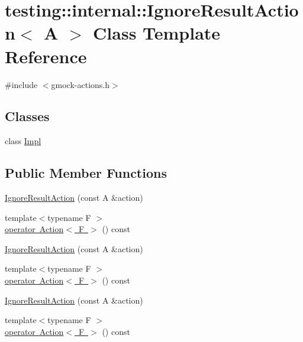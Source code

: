 \hypertarget{classtesting_1_1internal_1_1_ignore_result_action}{}\section{testing\+::internal\+::Ignore\+Result\+Action$<$ A $>$ Class Template Reference}
\label{classtesting_1_1internal_1_1_ignore_result_action}


{\ttfamily \#include $<$gmock-\/actions.\+h$>$}

\subsection*{Classes}
\begin{DoxyCompactItemize}
\item 
class \mbox{\hyperlink{classtesting_1_1internal_1_1_ignore_result_action_1_1_impl}{Impl}}
\end{DoxyCompactItemize}
\subsection*{Public Member Functions}
\begin{DoxyCompactItemize}
\item 
\mbox{\hyperlink{classtesting_1_1internal_1_1_ignore_result_action_a9199f7b1b7771b2e2a5fd28caf624623}{Ignore\+Result\+Action}} (const A \&action)
\item 
{\footnotesize template$<$typename F $>$ }\\\mbox{\hyperlink{classtesting_1_1internal_1_1_ignore_result_action_affb8b7439604c860e1416f45339c6e37}{operator Action$<$ F $>$}} () const
\item 
\mbox{\hyperlink{classtesting_1_1internal_1_1_ignore_result_action_a9199f7b1b7771b2e2a5fd28caf624623}{Ignore\+Result\+Action}} (const A \&action)
\item 
{\footnotesize template$<$typename F $>$ }\\\mbox{\hyperlink{classtesting_1_1internal_1_1_ignore_result_action_affb8b7439604c860e1416f45339c6e37}{operator Action$<$ F $>$}} () const
\item 
\mbox{\hyperlink{classtesting_1_1internal_1_1_ignore_result_action_a9199f7b1b7771b2e2a5fd28caf624623}{Ignore\+Result\+Action}} (const A \&action)
\item 
{\footnotesize template$<$typename F $>$ }\\\mbox{\hyperlink{classtesting_1_1internal_1_1_ignore_result_action_affb8b7439604c860e1416f45339c6e37}{operator Action$<$ F $>$}} () const
\end{DoxyCompactItemize}
